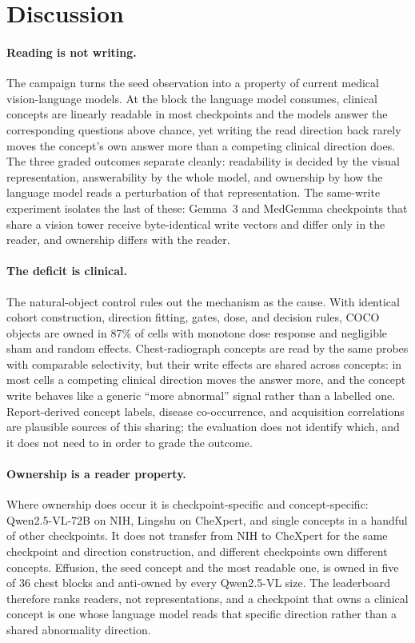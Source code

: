 \section{Discussion}
\label{sec:discussion}

\paragraph{Reading is not writing.}
The campaign turns the seed observation into a property of current medical vision-language models. At the block the language model consumes, clinical concepts are linearly readable in most checkpoints and the models answer the corresponding questions above chance, yet writing the read direction back rarely moves the concept's own answer more than a competing clinical direction does. The three graded outcomes separate cleanly: readability is decided by the visual representation, answerability by the whole model, and ownership by how the language model reads a perturbation of that representation. The same-write experiment isolates the last of these: Gemma~3 and MedGemma checkpoints that share a vision tower receive byte-identical write vectors and differ only in the reader, and ownership differs with the reader.

\paragraph{The deficit is clinical.}
The natural-object control rules out the mechanism as the cause. With identical cohort construction, direction fitting, gates, dose, and decision rules, COCO objects are owned in 87\% of cells with monotone dose response and negligible sham and random effects. Chest-radiograph concepts are read by the same probes with comparable selectivity, but their write effects are shared across concepts: in most cells a competing clinical direction moves the answer more, and the concept write behaves like a generic ``more abnormal'' signal rather than a labelled one. Report-derived concept labels, disease co-occurrence, and acquisition correlations are plausible sources of this sharing; the evaluation does not identify which, and it does not need to in order to grade the outcome.

\paragraph{Ownership is a reader property.}
Where ownership does occur it is checkpoint-specific and concept-specific: Qwen2.5-VL-72B on NIH, Lingshu on CheXpert, and single concepts in a handful of other checkpoints. It does not transfer from NIH to CheXpert for the same checkpoint and direction construction, and different checkpoints own different concepts. Effusion, the seed concept and the most readable one, is owned in five of 36 chest blocks and anti-owned by every Qwen2.5-VL size. The leaderboard therefore ranks readers, not representations, and a checkpoint that owns a clinical concept is one whose language model reads that specific direction rather than a shared abnormality direction.

